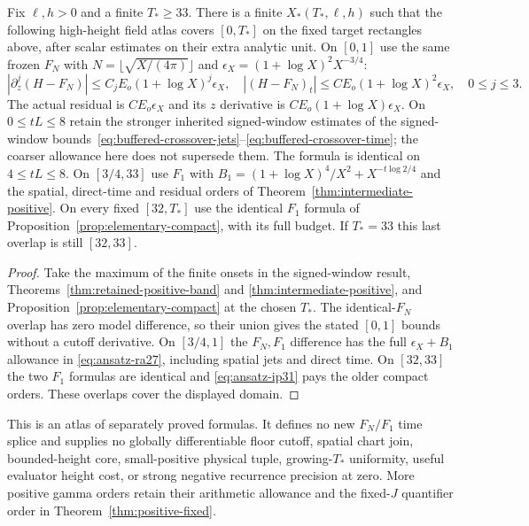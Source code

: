\begin{theorem}
\label{thm:positive-atlas}
Fix $\ell,h>0$ and a finite $T_*\ge33$. There is a finite
$X_*(T_*,\ell,h)$ such that the following high-height field atlas
covers $[0,T_*]$ on the fixed target rectangles above, after scalar
estimates on their extra analytic unit. On $[0,1]$ use the same frozen
$F_N$ with $N=\lfloor\sqrt{X/(4\pi)}\rfloor$ and
$\epsilon_X=(1+\log X)^2X^{-3/4}$:
\[
 |\partial_z^j(H-F_N)|\le C_jE_o(1+\log X)^j\epsilon_X,
 \quad |(H-F_N)_t|\le CE_o(1+\log X)^2\epsilon_X,
 \quad 0\le j\le3.
\]
The actual residual is $CE_o\epsilon_X$ and its $z$ derivative is
$CE_o(1+\log X)\epsilon_X$. On $0\le tL\le8$ retain the
stronger inherited signed-window estimates of
the signed-window bounds~\eqref{eq:buffered-crossover-jets}--\eqref{eq:buffered-crossover-time}; the coarser allowance here
does not supersede them. The formula is identical on $4\le tL\le8$.
On $[3/4,33]$ use $F_1$ with
$B_1=(1+\log X)^4/X^2+X^{-t\log2/4}$ and the spatial, direct-time
and residual orders of Theorem~\ref{thm:intermediate-positive}.
On every fixed $[32,T_*]$ use the identical $F_1$ formula of
Proposition~\ref{prop:elementary-compact}, with its full budget.
If $T_*=33$ this last overlap is still $[32,33]$.
\end{theorem}
\begin{proof}
Take the maximum of the finite onsets in the signed-window result,
Theorems~\ref{thm:retained-positive-band} and
\ref{thm:intermediate-positive}, and
Proposition~\ref{prop:elementary-compact} at the chosen $T_*$.
The identical-$F_N$ overlap has zero model difference, so their
union gives the stated $[0,1]$ bounds without a cutoff derivative.
On $[3/4,1]$ the $F_N,F_1$ difference has the full
$\epsilon_X+B_1$ allowance in \eqref{eq:ansatz-ra27}, including
spatial jets and direct time. On $[32,33]$ the two $F_1$ formulas
are identical and \eqref{eq:ansatz-ip31} pays the older compact
orders. These overlaps cover the displayed domain.
\end{proof}
This is an atlas of separately proved formulas. It defines no new
$F_N/F_1$ time splice and supplies no globally differentiable floor
cutoff, spatial chart join, bounded-height core, small-positive
physical tuple, growing-$T_*$ uniformity, useful evaluator height cost,
or strong negative recurrence precision at zero. More positive gamma
orders retain their arithmetic allowance and the fixed-$J$ quantifier
order in Theorem~\ref{thm:positive-fixed}.
